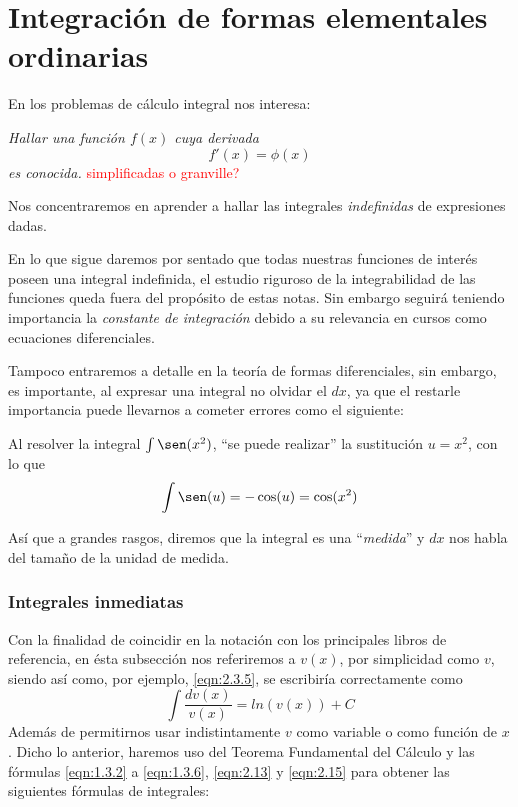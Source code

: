 \section{Integración de formas elementales ordinarias}

En los problemas de cálculo integral nos interesa:

\textsl{Hallar una función $f(x)$ cuya derivada}
$$f'(x)=\phi(x)$$
\textsl{es conocida.}
\textcolor{red}{simplificadas o granville?}

Nos concentraremos en aprender a hallar las integrales \textsl{indefinidas} de expresiones dadas.

En lo que sigue daremos por sentado que todas nuestras funciones de interés poseen una integral indefinida, el estudio riguroso de la integrabilidad de las funciones queda fuera del propósito de estas notas. Sin embargo seguirá teniendo importancia la \textsl{constante de integración} debido a su relevancia en cursos como ecuaciones diferenciales.

Tampoco entraremos a detalle en la teoría de formas diferenciales, sin embargo, es importante, al expresar una integral no olvidar el $dx$, ya que el restarle importancia puede llevarnos a cometer errores como el siguiente:

Al resolver la integral $\int\sen(x^2)$, ``se puede realizar'' la sustitución $u=x^2$, con lo que $$\int\sen(u)=-\cos(u)=\cos(x^2)$$

Así que a grandes rasgos, diremos que la integral es una ``\textsl{medida}'' y $dx$ nos habla del tamaño de la unidad de medida.

\subsubsection{Integrales inmediatas}
Con la finalidad de coincidir en la notación con los principales libros de referencia, en ésta subsección nos referiremos a $v(x)$, por simplicidad como $v$, siendo así como, por ejemplo, \cref{eqn:2.3.5}, se escribiría correctamente como
$$\int \frac{dv(x)}{v(x)}=ln(v(x))+C$$
Además de permitirnos usar indistintamente $v$ como variable o como función de $x$. Dicho lo anterior, haremos uso del Teorema Fundamental del Cálculo y las fórmulas \ref{eqn:1.3.2} a \ref{eqn:1.3.6}, \ref{eqn:2.13} y \ref{eqn:2.15} para obtener las siguientes fórmulas de integrales:

